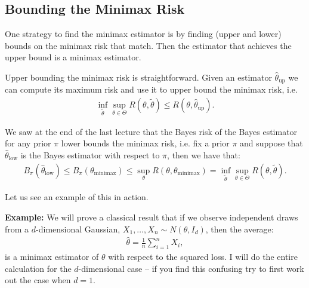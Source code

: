 \documentclass[twoside,12pt]{article}
\begin{document}
\subsection{Bounding the Minimax Risk}
One strategy to find the minimax estimator is by finding (upper and lower) bounds on the minimax risk that match. Then the estimator that achieves the upper bound is a minimax estimator. 

Upper bounding the minimax risk is straightforward. Given an estimator $\widehat{\theta}_{\text{up}}$ we can compute its maximum risk and use it to upper bound the minimax risk, i.e. 
\begin{align*}
\inf_{\widetilde{\theta}}\sup_{\theta\in\Theta}R(\theta,\widetilde{\theta}) \leq R(\theta, \widehat{\theta}_{\text{up}}).
\end{align*}

We saw at the end of the last lecture that the Bayes risk of the Bayes estimator for any prior $\pi$ lower bounds the minimax risk, i.e. fix a prior $\pi$ and suppose that $\widehat{\theta}_{\text{low}}$ is the Bayes estimator with respect to $\pi$, then we have that:
\begin{align*}
B_{\pi}(\widehat{\theta}_{\text{low}}) \leq B_{\pi}(\theta_{\text{minimax}}) \leq \sup_{\theta} R(\theta,\theta_{\text{minimax}}) = \inf_{\widetilde{\theta}}\sup_{\theta\in\Theta}R(\theta,\widetilde{\theta}).
\end{align*}

Let us see an example of this in action. 

{\bf Example: } We will prove a classical result that if we observe independent draws from a $d$-dimensional Gaussian, $X_1,\ldots,X_n \sim N(\theta, I_{d})$, then the average:
\begin{align*}
\widehat{\theta} = \frac{1}{n} \sum_{i=1}^n X_i,
\end{align*} 
is a minimax estimator of $\theta$ with respect to the squared loss. I will do the entire calculation for the $d$-dimensional case -- if you find this confusing try to first work out the case when $d = 1$.
\end{document}
